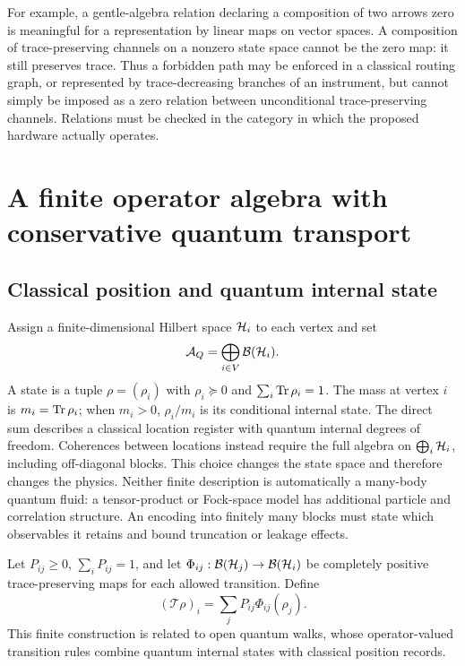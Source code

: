For example, a gentle-algebra relation declaring a composition of two
arrows zero is meaningful for a representation by linear maps on vector
spaces. A composition of trace-preserving channels on a nonzero state space
cannot be the zero map: it still preserves trace. Thus a forbidden path may
be enforced in a classical routing graph, or represented by trace-decreasing
branches of an instrument, but cannot simply be imposed as a zero relation
between unconditional trace-preserving channels. Relations must be checked
in the category in which the proposed hardware actually operates.

\section{A finite operator algebra with conservative quantum transport}

\subsection{Classical position and quantum internal state}

Assign a finite-dimensional Hilbert space $\mathcal{H}_i$ to each vertex and set
\[
 \mathcal A_Q=\bigoplus_{i\in V}\mathcal B(\mathcal{H}_i).
\]
A state is a tuple $\rho=(\rho_i)$ with $\rho_i\succeq0$ and
$\sum_i\operatorname{Tr}\rho_i=1$. The mass at vertex $i$ is
$m_i=\operatorname{Tr}\rho_i$; when $m_i>0$, $\rho_i/m_i$ is its conditional internal
state. The direct sum describes a classical location register with quantum
internal degrees of freedom. Coherences between locations instead require
the full algebra on $\bigoplus_i\mathcal{H}_i$, including off-diagonal blocks.
This choice changes the state space and therefore changes the physics.
Neither finite description is automatically a many-body quantum fluid:
a tensor-product or Fock-space model has additional particle and correlation
structure. An encoding into finitely many blocks must state which
observables it retains and bound truncation or leakage effects.

Let $P_{ij}\ge0$, $\sum_iP_{ij}=1$, and let
$\Phi_{ij}:\mathcal B(\mathcal{H}_j)\to\mathcal B(\mathcal{H}_i)$ be completely
positive trace-preserving maps for each allowed transition. Define
\begin{equation}\label{eq:qtf-transport}
 (\mathcal T\rho)_i=\sum_jP_{ij}\Phi_{ij}(\rho_j).
\end{equation}
This finite construction is related to open quantum walks, whose
operator-valued transition rules combine quantum internal states with
classical position records.\cite{qtsAttal2012}

